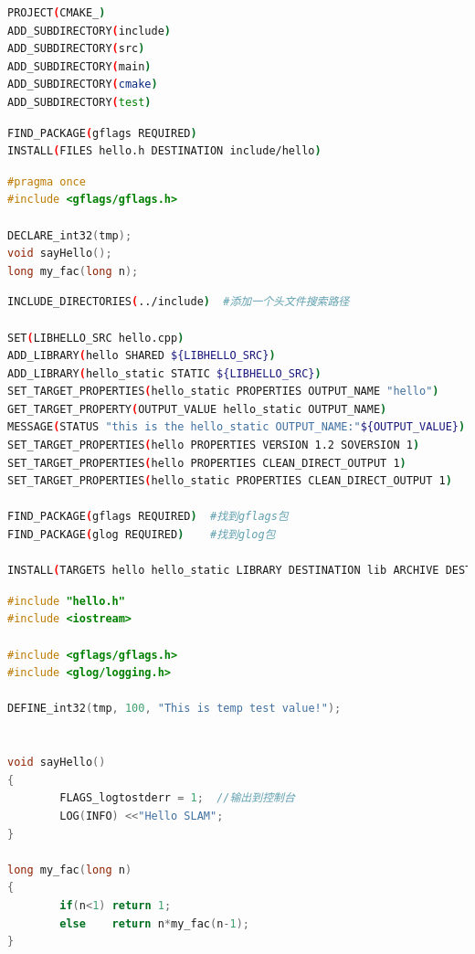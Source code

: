 \documentclass[40pt,a4paper，UTF8]{ctexart}
\begin{document}
\begin{lstlisting}[language=bash, caption=工程/CMakeLists.txt]
PROJECT(CMAKE_)
ADD_SUBDIRECTORY(include)
ADD_SUBDIRECTORY(src)
ADD_SUBDIRECTORY(main)
ADD_SUBDIRECTORY(cmake)
ADD_SUBDIRECTORY(test)
\end{lstlisting}

\begin{lstlisting}[language=bash, caption=include/CMakeLists.txt]
FIND_PACKAGE(gflags REQUIRED)
INSTALL(FILES hello.h DESTINATION include/hello)
\end{lstlisting}

\begin{lstlisting}[language=C++, caption=include/hello.h]
#pragma once
#include <gflags/gflags.h>

DECLARE_int32(tmp);
void sayHello(); 
long my_fac(long n);
\end{lstlisting}

\begin{lstlisting}[language=bash, caption=src/CMakeLists.txt]
INCLUDE_DIRECTORIES(../include)  #添加一个头文件搜索路径

SET(LIBHELLO_SRC hello.cpp)
ADD_LIBRARY(hello SHARED ${LIBHELLO_SRC})
ADD_LIBRARY(hello_static STATIC ${LIBHELLO_SRC})
SET_TARGET_PROPERTIES(hello_static PROPERTIES OUTPUT_NAME "hello")
GET_TARGET_PROPERTY(OUTPUT_VALUE hello_static OUTPUT_NAME)
MESSAGE(STATUS "this is the hello_static OUTPUT_NAME:"${OUTPUT_VALUE})
SET_TARGET_PROPERTIES(hello PROPERTIES VERSION 1.2 SOVERSION 1)
SET_TARGET_PROPERTIES(hello PROPERTIES CLEAN_DIRECT_OUTPUT 1)
SET_TARGET_PROPERTIES(hello_static PROPERTIES CLEAN_DIRECT_OUTPUT 1)

FIND_PACKAGE(gflags REQUIRED)  #找到gflags包
FIND_PACKAGE(glog REQUIRED)    #找到glog包

INSTALL(TARGETS hello hello_static LIBRARY DESTINATION lib ARCHIVE DESTINATION lib)
\end{lstlisting}

\begin{lstlisting}[language=C++, caption=src/hello.cpp]
#include "hello.h"
#include <iostream>

#include <gflags/gflags.h>
#include <glog/logging.h>

DEFINE_int32(tmp, 100, "This is temp test value!");


void sayHello()
{
        FLAGS_logtostderr = 1;  //输出到控制台
        LOG(INFO) <<"Hello SLAM";
}

long my_fac(long n)
{
        if(n<1) return 1;
        else    return n*my_fac(n-1);
}
\end{lstlisting}
\end{document}
